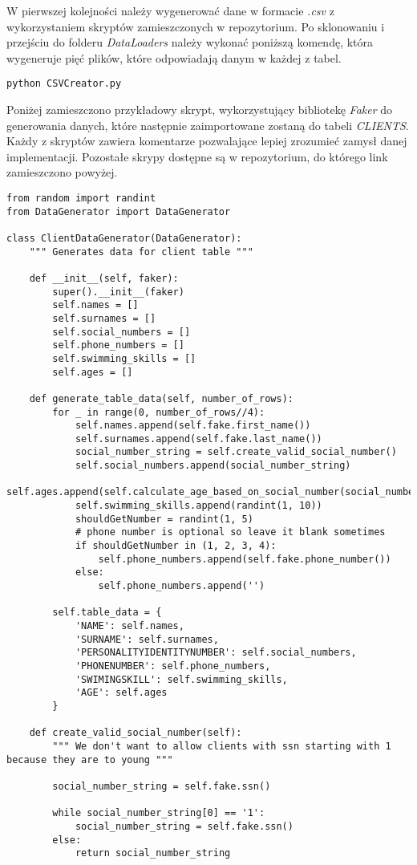 \documentclass[a4paper]{article}
\begin{document}
W pierwszej kolejności należy wygenerować dane w formacie \textit{.csv} z wykorzystaniem skryptów zamieszczonych w repozytorium. Po sklonowaniu i przejściu do folderu \textit{DataLoaders} należy wykonać poniższą komendę, która wygeneruje pięć plików, które odpowiadają danym w każdej z tabel.

\begin{verbatim}
python CSVCreator.py
\end{verbatim}

Poniżej zamieszczono przykładowy skrypt, wykorzystujący bibliotekę \textit{Faker} do generowania danych, które następnie zaimportowane zostaną do tabeli \textit{CLIENTS}. Każdy z skryptów zawiera komentarze pozwalające lepiej zrozumieć zamysł danej implementacji. Pozostałe skrypy dostępne są w repozytorium, do którego link zamieszczono powyżej.

\newpage

\begin{verbatim}
from random import randint
from DataGenerator import DataGenerator

class ClientDataGenerator(DataGenerator):
    """ Generates data for client table """

    def __init__(self, faker):
        super().__init__(faker)
        self.names = []
        self.surnames = []
        self.social_numbers = []
        self.phone_numbers = []
        self.swimming_skills = []
        self.ages = []

    def generate_table_data(self, number_of_rows):
        for _ in range(0, number_of_rows//4):
            self.names.append(self.fake.first_name())
            self.surnames.append(self.fake.last_name())
            social_number_string = self.create_valid_social_number()
            self.social_numbers.append(social_number_string)
            self.ages.append(self.calculate_age_based_on_social_number(social_number_string))
            self.swimming_skills.append(randint(1, 10))
            shouldGetNumber = randint(1, 5)
            # phone number is optional so leave it blank sometimes
            if shouldGetNumber in (1, 2, 3, 4):
                self.phone_numbers.append(self.fake.phone_number())
            else:
                self.phone_numbers.append('')

        self.table_data = {
            'NAME': self.names,
            'SURNAME': self.surnames,
            'PERSONALITYIDENTITYNUMBER': self.social_numbers,
            'PHONENUMBER': self.phone_numbers,
            'SWIMINGSKILL': self.swimming_skills,
            'AGE': self.ages
        }

    def create_valid_social_number(self):
        """ We don't want to allow clients with ssn starting with 1 because they are to young """

        social_number_string = self.fake.ssn()

        while social_number_string[0] == '1':
            social_number_string = self.fake.ssn()
        else:
            return social_number_string

\end{verbatim}
\end{document}
